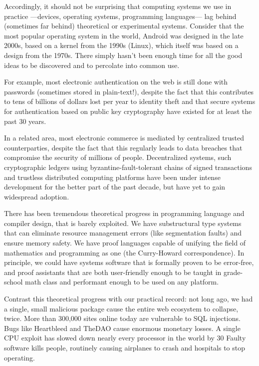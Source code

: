 \documentclass{article}
\theoremstyle{definition}
\theoremstyle{theorem}
\begin{document}
Accordingly, it should not be surprising that computing systems we use in
practice ---devices, operating systems, programming languages--- lag behind
(sometimes far behind) theoretical or experimental systems. Consider that the
most popular operating system in the world, Android was designed in the late
2000s, based on a kernel from the 1990s (Linux), which itself was based on a
design from the 1970s. There simply hasn't been enough time for all the good
ideas to be discovered and to percolate into common use.

For example, most electronic authentication on the web is still done with
passwords (sometimes stored in plain-text!), despite the fact that this
contributes to tens of billions of dollars lost per year to identity theft and
that secure systems for authentication based on public key cryptography have
existed for at least the past 30 years.

In a related area, most electronic commerce is mediated by centralized trusted
counterparties, despite the fact that this regularly leads to data breaches that
compromise the security of millions of people. Decentralized systems, such
cryptographic ledgers using byzantine-fault-tolerant chains of signed
transactions and trustless distributed computing platforms have been under
intense development for the better part of the past decade, but have yet to gain
widespread adoption.

There has been tremendous theoretical progress in programming language and
compiler design, that is barely exploited. We have substructural type systems
that can eliminate resource management errors (like segmentation faults) and
ensure memory safety. We have proof languages capable of unifying the field of
mathematics and programming as one (the Curry-Howard correspondence). In
principle, we could have systems software that is formally proven to be
error-free, and proof assistants that are both user-friendly enough to be taught
in grade-school math class and performant enough to be used on any platform.

Contrast this theoretical progress with our practical record: not long ago, we
had a single, small malicious package cause the entire web ecosystem to
collapse, twice. More than 300,000 sites online today are vulnerable to SQL
injections. Bugs like Heartbleed and TheDAO cause enormous monetary losses. A
single CPU exploit has slowed down nearly every processor in the world by 30%
Faulty software kills people, routinely causing airplanes to crash and hospitals
to stop operating.
\end{document}
